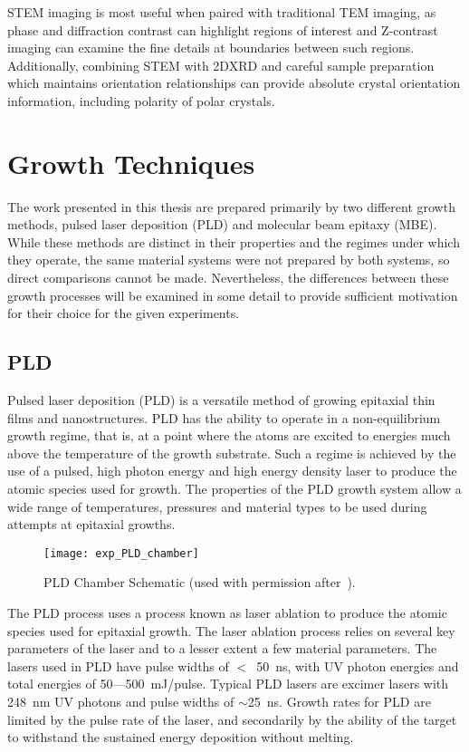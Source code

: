 STEM imaging is most useful when paired with traditional TEM imaging, as phase and diffraction contrast can highlight regions of interest and Z-contrast imaging can examine the fine details at boundaries between such regions.
Additionally, combining STEM with 2DXRD and careful sample preparation which maintains orientation relationships can provide absolute crystal orientation information, including polarity of polar crystals.

\section{Growth Techniques}
The work presented in this thesis are prepared primarily by two different growth methods, pulsed laser deposition (PLD) and molecular beam epitaxy (MBE).
While these methods are distinct in their properties and the regimes under which they operate, the same material systems were not prepared by both systems, so direct comparisons cannot be made.
Nevertheless, the differences between these growth processes will be examined in some detail to provide sufficient motivation for their choice for the given experiments.
\subsection{PLD} Pulsed laser deposition (PLD) is a versatile method of growing epitaxial thin films and nanostructures.
PLD has the ability to operate in a non-equilibrium growth regime, that is, at a point where the atoms are excited to energies much above the temperature of the growth substrate.
Such a regime is achieved by the use of a pulsed, high photon energy and high energy density laser to produce the atomic species used for growth.
The properties of the PLD growth system allow a wide range of temperatures, pressures and material types to be used during attempts at epitaxial growths.
\begin{figure}
 \centering \texttt{[image: exp\_PLD\_chamber]}
 \caption[PLD chamber schematic]{\label{fig:exp_pld_chamber}PLD Chamber Schematic (used with permission after~\cite{stephen-thesis}).}
\end{figure}

The PLD process uses a process known as laser ablation to produce the atomic species used for epitaxial growth.
The laser ablation process relies on several key parameters of the laser and to a lesser extent a few material parameters.
The lasers used in PLD have pulse widths of \(<\)~50~ns, with UV photon energies and total energies of 50---500~mJ/pulse.
Typical PLD lasers are excimer lasers with 248~nm UV photons and pulse widths of \(\sim\)25~ns.
Growth rates for PLD are limited by the pulse rate of the laser, and secondarily by the ability of the target to withstand the sustained energy deposition without melting.

